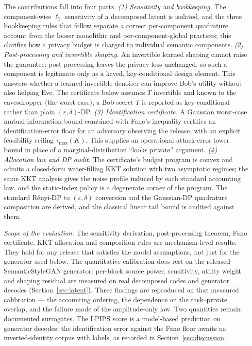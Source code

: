\documentclass[10pt,twocolumn,letterpaper]{article}
\theoremstyle{plain}
\theoremstyle{definition}
\begin{document}
The contributions fall into four parts.
\emph{(1) Sensitivity and bookkeeping.} The component-wise $\ell_2$ sensitivity
of a decomposed latent is isolated, and the three bookkeeping rules that follow
separate a correct per-component quadrature account from the looser monolithic
and per-component-global practices; this clarifies how a privacy budget is
charged to individual semantic components.
\emph{(2) Post-processing and invertible shaping.} An invertible learned shaping
cannot raise the guarantee: post-processing leaves the privacy loss unchanged,
so such a component is legitimate only as a keyed, key-conditional design
element. This answers whether a learned invertible denoiser can improve Bob's
utility without also helping Eve. The certificate below assumes $T$ invertible
and known to the eavesdropper (the worst case); a Bob-secret $T$ is reported as
key-conditional rather than plain $(\varepsilon,\delta)$-DP.
\emph{(3) Identification certificate.} A Gaussian worst-case mutual-information
bound combined with Fano's inequality certifies an identification-error floor
for an adversary observing the release, with an explicit feasibility ceiling
$\tau_{\max}(K)$. This supplies an operational attack-error lower bound in
place of a marginal-distribution ``looks private'' argument.
\emph{(4) Allocation law and DP audit.} The certificate's budget program is
convex and admits a closed-form water-filling KKT solution with two asymptotic
regimes; the same KKT analysis gives the noise profile induced by each standard
accounting law, and the static-index policy is a degenerate corner of the
program. The standard R\'enyi-DP to $(\varepsilon,\delta)$ conversion and the
Gaussian-DP quadrature composition are derived, and the classical linear tail
bound is audited against them.

\emph{Scope of the evaluation.} The sensitivity derivation, post-processing theorem, Fano certificate, KKT
allocation and composition rules are mechanism-level results. They hold for any release
that satisfies the model assumptions, not just for the generator used below. The
quantitative calibration does rest on the released SemanticStyleGAN generator: per-block
source power, sensitivity, utility weight and shaping residual are measured on real
decomposed codes and generator decodes (Section~\ref{sec:latent}). Three findings are reproduced on
that measured calibration --- the accounting ordering, the dependence on the
task--private overlap, and the failure mode of the amplitude-only law. Two quantities
remain documented surrogates. The LPIPS score is a model-based prediction on generator
decodes; the identification error against the Fano floor awaits an inverted-identity
corpus with labels, as recorded in Section~\ref{sec:discussion}.
\end{document}
